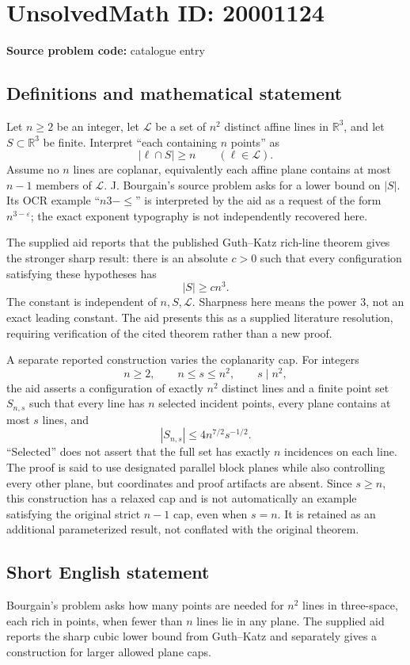 \documentclass[11pt]{article}
\newcommand{\R}{\mathbb{R}}
\begin{document}
\section*{UnsolvedMath ID: 20001124}
\textbf{Source problem code:} catalogue entry
\subsection{Definitions and mathematical statement}
Let \(n\ge2\) be an integer, let \(\mathcal L\) be a set of \(n^2\) distinct affine lines in \(\R^3\), and let \(S\subset\R^3\) be finite. Interpret ``each containing \(n\) points'' as
\[
 |\ell\cap S|\ge n\qquad(\ell\in\mathcal L).
\]
Assume no \(n\) lines are coplanar, equivalently each affine plane contains at most \(n-1\) members of \(\mathcal L\). J. Bourgain's source problem asks for a lower bound on \(|S|\). Its OCR example ``\(n3-\le\)'' is interpreted by the aid as a request of the form \(n^{3-\varepsilon}\); the exact exponent typography is not independently recovered here.

The supplied aid reports that the published Guth--Katz rich-line theorem gives the stronger sharp result: there is an absolute \(c>0\) such that every configuration satisfying these hypotheses has
\[
 |S|\ge cn^3.
\]
The constant is independent of \(n,S,\mathcal L\). Sharpness here means the power \(3\), not an exact leading constant. The aid presents this as a supplied literature resolution, requiring verification of the cited theorem rather than a new proof.

A separate reported construction varies the coplanarity cap. For integers
\[
 n\ge2,\qquad n\le s\le n^2,\qquad s\mid n^2,
\]
the aid asserts a configuration of exactly \(n^2\) distinct lines and a finite point set \(S_{n,s}\) such that every line has \(n\) selected incident points, every plane contains at most \(s\) lines, and
\[
 |S_{n,s}|\le4n^{7/2}s^{-1/2}.
\]
``Selected'' does not assert that the full set has exactly \(n\) incidences on each line. The proof is said to use designated parallel block planes while also controlling every other plane, but coordinates and proof artifacts are absent. Since \(s\ge n\), this construction has a relaxed cap and is not automatically an example satisfying the original strict \(n-1\) cap, even when \(s=n\). It is retained as an additional parameterized result, not conflated with the original theorem.
\subsection{Short English statement}
Bourgain's problem asks how many points are needed for \(n^2\) lines in three-space, each rich in points, when fewer than \(n\) lines lie in any plane. The supplied aid reports the sharp cubic lower bound from Guth--Katz and separately gives a construction for larger allowed plane caps.
\end{document}
